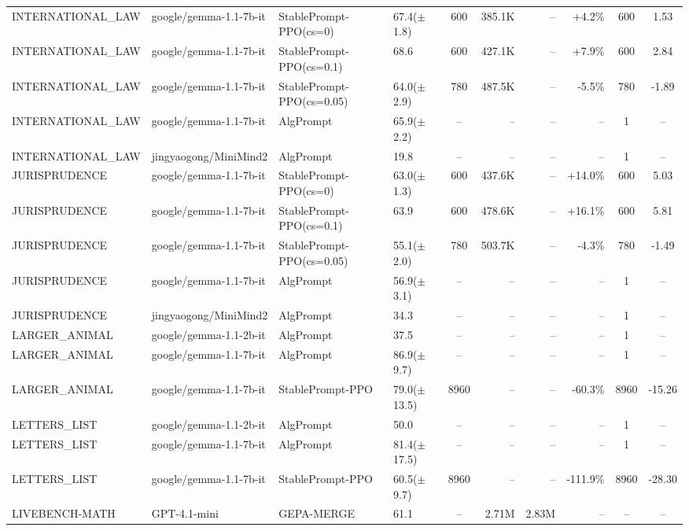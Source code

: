 {\begin{longtable}{@{}p{5.5cm}p{4.5cm}p{2.5cm}lcrrrcc@{}}
\midrule
INTERNATIONAL\_LAW & google/gemma-1.1-7b-it & StablePrompt-PPO(cs=0) & 67.4($\pm$1.8) & 600 & 385.1K & -- & +4.2\% & 600 & 1.53 \\
INTERNATIONAL\_LAW & google/gemma-1.1-7b-it & StablePrompt-PPO(cs=0.1) & 68.6 & 600 & 427.1K & -- & +7.9\% & 600 & 2.84 \\
INTERNATIONAL\_LAW & google/gemma-1.1-7b-it & StablePrompt-PPO(cs=0.05) & 64.0($\pm$2.9) & 780 & 487.5K & -- & -5.5\% & 780 & -1.89 \\
INTERNATIONAL\_LAW & google/gemma-1.1-7b-it & AlgPrompt & 65.9($\pm$2.2) & -- & -- & -- & -- & 1 & -- \\
\midrule
INTERNATIONAL\_LAW & jingyaogong/MiniMind2 & AlgPrompt & 19.8 & -- & -- & -- & -- & 1 & -- \\
\midrule
JURISPRUDENCE & google/gemma-1.1-7b-it & StablePrompt-PPO(cs=0) & 63.0($\pm$1.3) & 600 & 437.6K & -- & +14.0\% & 600 & 5.03 \\
JURISPRUDENCE & google/gemma-1.1-7b-it & StablePrompt-PPO(cs=0.1) & 63.9 & 600 & 478.6K & -- & +16.1\% & 600 & 5.81 \\
JURISPRUDENCE & google/gemma-1.1-7b-it & StablePrompt-PPO(cs=0.05) & 55.1($\pm$2.0) & 780 & 503.7K & -- & -4.3\% & 780 & -1.49 \\
JURISPRUDENCE & google/gemma-1.1-7b-it & AlgPrompt & 56.9($\pm$3.1) & -- & -- & -- & -- & 1 & -- \\
\midrule
JURISPRUDENCE & jingyaogong/MiniMind2 & AlgPrompt & 34.3 & -- & -- & -- & -- & 1 & -- \\
\midrule
LARGER\_ANIMAL & google/gemma-1.1-2b-it & AlgPrompt & 37.5 & -- & -- & -- & -- & 1 & -- \\
\midrule
LARGER\_ANIMAL & google/gemma-1.1-7b-it & AlgPrompt & 86.9($\pm$9.7) & -- & -- & -- & -- & 1 & -- \\
LARGER\_ANIMAL & google/gemma-1.1-7b-it & StablePrompt-PPO & 79.0($\pm$13.5) & 8960 & -- & -- & -60.3\% & 8960 & -15.26 \\
\midrule
LETTERS\_LIST & google/gemma-1.1-2b-it & AlgPrompt & 50.0 & -- & -- & -- & -- & 1 & -- \\
\midrule
LETTERS\_LIST & google/gemma-1.1-7b-it & AlgPrompt & 81.4($\pm$17.5) & -- & -- & -- & -- & 1 & -- \\
LETTERS\_LIST & google/gemma-1.1-7b-it & StablePrompt-PPO & 60.5($\pm$9.7) & 8960 & -- & -- & -111.9\% & 8960 & -28.30 \\
\midrule
LIVEBENCH-MATH & GPT-4.1-mini & GEPA-MERGE & 61.1 & -- & 2.71M & 2.83M & -- & -- & -- \\

\end{longtable}}
